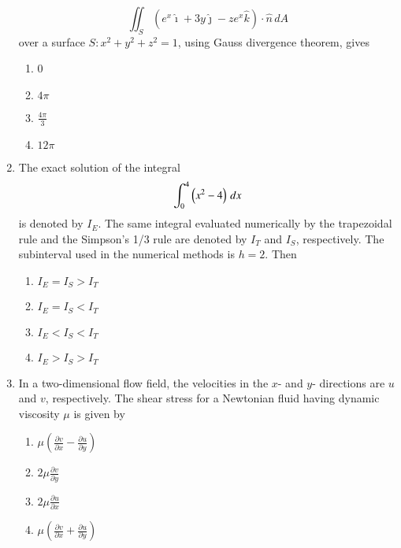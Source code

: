 \documentclass[journal]{IEEEtran}
\begin{document}
\begin{enumerate}
{    	$$
    	\iint_S (e^x\hat{\imath} +3y\hat{\jmath} - ze^x\hat{k})\cdot \hat{n} \, dA
    	$$
    	over a surface \( S : x^2 + y^2 + z^2 = 1 \), using Gauss divergence theorem, gives
    	\begin{multicols}{4}
	    	\begin{enumerate}
	    		\item 0
	    		\item $4\pi$
	    		\item $\frac{4\pi}{3}$
	    		\item $12\pi$
	    	\end{enumerate}
    	\end{multicols}}    
    \item {The exact solution of the integral
    	$$
    	\int_0^4 \left(x^2-4\right) \, dx
    	$$
    	is denoted by \( I_E \). The same integral evaluated numerically by the trapezoidal rule and the Simpson’s 1/3 rule are denoted by \( I_T \) and \( I_S \), respectively. The subinterval used in the numerical methods is \( h = 2 \). Then
        \begin{multicols}{2}
	    	\begin{enumerate}
	    		\item \( I_E = I_S > I_T \)
	    		\item \( I_E = I_S < I_T \)
	    		\item \( I_E < I_S < I_T \)
	    		\item \( I_E > I_S > I_T \)
	    	\end{enumerate}
    	\end{multicols}
	}
    \item {
    	In a two-dimensional flow field, the velocities in the $x$- and $y$- directions are $u$ and $v$, respectively. The shear stress for a Newtonian fluid having dynamic viscosity $\mu$ is given by
    	
    	
    	\begin{multicols}{4}
    		\begin{enumerate}
    			\item $
    			\mu \left( \frac{\partial v}{\partial x} - \frac{\partial u}{\partial y} \right)
    			$
    			
    			\item $
    			2\mu \frac{\partial v}{\partial y}
    			$
    			
    			\item $
    			2\mu \frac{\partial u}{\partial x}
    			$
    			
    			\item $
    			\mu \left( \frac{\partial v}{\partial x} + \frac{\partial u}{\partial y} \right)
    			$
    		\end{enumerate}
    	\end{multicols}
    
}
\end{enumerate}
\end{document}
